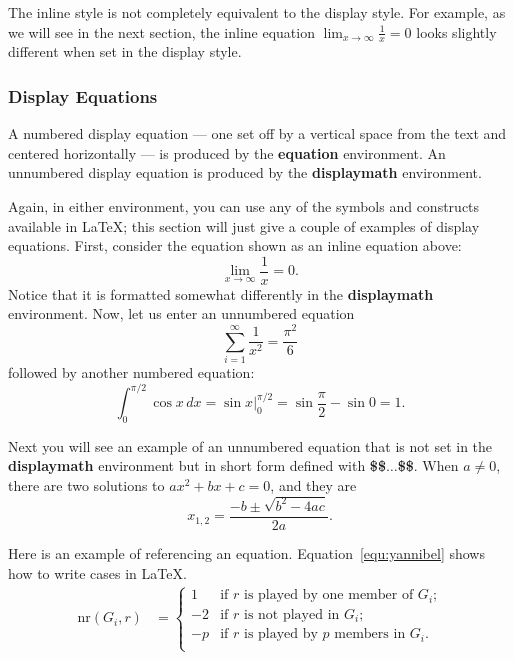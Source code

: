 \documentclass[sigconf]{acmart}
\begin{document}
The inline style is not completely equivalent to the display style. For
example, as we will see in the next section, the inline equation
\begin{math}\lim_{x\rightarrow \infty}\frac{1}{x}=0\end{math} 
looks slightly different when set in the display style.

\subsubsection{Display Equations}

A numbered display equation --- one set off by a vertical space from the text
and centered horizontally --- is produced by the \textbf{equation}
environment.  An unnumbered display equation is produced by the
\textbf{displaymath} environment.

Again, in either environment, you can use any of the symbols and constructs
available in \LaTeX; this section will just give a couple of examples of
display equations.  First, consider the equation shown as an inline equation
above:
%
\begin{equation}
\lim_{x\rightarrow \infty}\frac{1}{x}=0.
\end{equation}
%
Notice that it is formatted somewhat differently in the \textbf{displaymath}
environment.  Now, let us enter an unnumbered equation
%
\begin{displaymath}
    \sum_{i=1}^{\infty} \frac{1}{x^2} = \frac{\pi^2}{6}
\end{displaymath}
%
followed by another numbered equation:
%
\begin{equation}
    \int_{0}^{\pi/2} \cos x\,dx = \sin x\bigg\rvert_{0}^{\pi/2} = \sin
    \frac{\pi}{2} - \sin 0 = 1.
\end{equation}

Next you will see an example of an unnumbered equation that is not set in the
\textbf{displaymath} environment but in short form defined with
\textbf{\$\$$\ldots$\$\$}.  When $a \ne 0$, there are two solutions to $ax^2 +
bx + c = 0$, and they are
%
$$x_{1, 2} = \frac{-b \pm \sqrt{b^2-4ac}}{2a}.$$

Here is an example of referencing an equation. Equation~\ref{equ:yannibel}
shows how to write cases in \LaTeX.
%
\begin{equation}
    \begin{aligned} 
        \mathrm{nr}(G_i,r) & = \label{equ:yannibel}
        \begin{cases}
            1  & \text{if $r$ is played by one member of $G_i$;}\\
            -2 & \text{if $r$ is not played in $G_i$;} \\
            -p & \text{if $r$ is played by $p$ members in $G_i$.}\\
        \end{cases}
    \end{aligned}
\end{equation}
\end{document}
